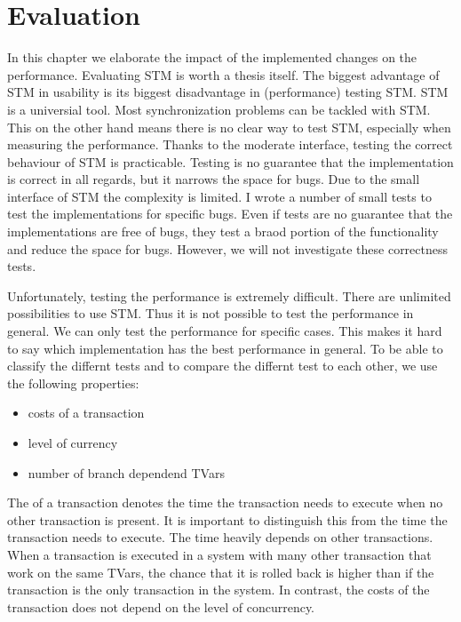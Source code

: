 
\chapter{Evaluation} 

\label{Chapter4}
In this chapter we elaborate the impact of the implemented changes on the performance.
Evaluating STM is worth a thesis itself. The biggest advantage of STM in usability is
its biggest disadvantage in (performance) testing STM. STM is a universial tool. Most
synchronization problems can be tackled with STM. This on the other hand means there
is no clear way to test STM, especially when measuring the performance. Thanks to
the moderate interface, testing the correct behaviour of STM is practicable. Testing 
is no guarantee that the implementation is correct in all regards, but it narrows the 
space for bugs. Due to the small interface of STM the complexity is limited. 
I wrote a number of small tests to test the implementations for specific bugs. Even if 
tests are no guarantee that the implementations are free of bugs, they test a braod portion
of the functionality and reduce the space for bugs. However, we will not investigate these 
correctness tests.


Unfortunately, testing the performance is extremely difficult. There are unlimited 
possibilities to use STM. Thus it is not possible to test the performance in general.
We can only test the performance for specific cases. This makes it hard to say which 
implementation has the best performance in general. To be able to classify the differnt 
tests and to compare the differnt test to each other, we use the following properties: 
\begin{itemize}
 \item costs of a transaction
 \item level of currency
 \item number of branch dependend TVars 
\end{itemize}
The  of a transaction denotes the time the transaction needs to execute when no 
other transaction is present.  
It is important to distinguish this from the time the transaction needs to execute. The
time heavily depends on other transactions. When a transaction is executed in a system
with many other transaction that work on the same TVars, the chance that it is rolled 
back is higher than if the transaction is the only transaction in the system. In contrast, the costs
of the transaction does not depend on the level of concurrency.

